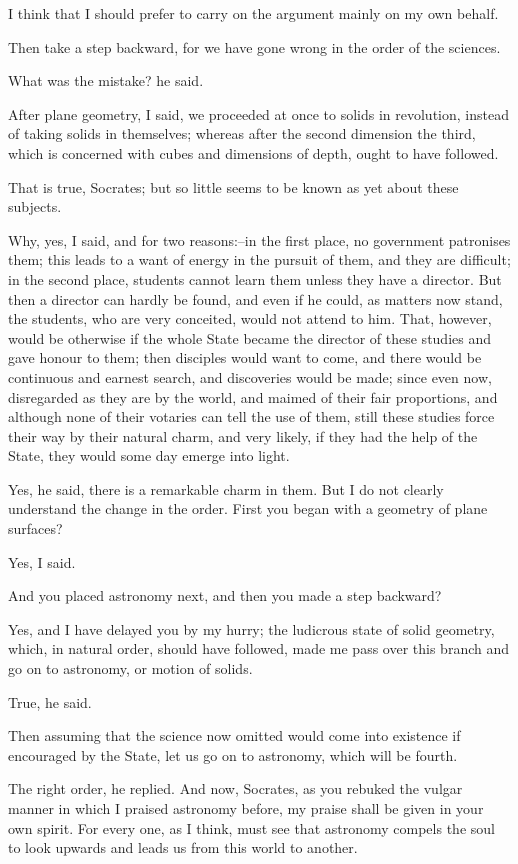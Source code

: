 I think that I should prefer to carry on the argument mainly on my own
behalf.

Then take a step backward, for we have gone wrong in the order of the
sciences.

What was the mistake? he said.

After plane geometry, I said, we proceeded at once to solids in
revolution, instead of taking solids in themselves; whereas after the
second dimension the third, which is concerned with cubes and dimensions
of depth, ought to have followed.

That is true, Socrates; but so little seems to be known as yet about
these subjects.

Why, yes, I said, and for two reasons:--in the first place, no
government patronises them; this leads to a want of energy in the
pursuit of them, and they are difficult; in the second place, students
cannot learn them unless they have a director. But then a director
can hardly be found, and even if he could, as matters now stand,
the students, who are very conceited, would not attend to him. That,
however, would be otherwise if the whole State became the director of
these studies and gave honour to them; then disciples would want to
come, and there would be continuous and earnest search, and discoveries
would be made; since even now, disregarded as they are by the world, and
maimed of their fair proportions, and although none of their votaries
can tell the use of them, still these studies force their way by their
natural charm, and very likely, if they had the help of the State, they
would some day emerge into light.

Yes, he said, there is a remarkable charm in them. But I do not clearly
understand the change in the order. First you began with a geometry of
plane surfaces?

Yes, I said.

And you placed astronomy next, and then you made a step backward?

Yes, and I have delayed you by my hurry; the ludicrous state of solid
geometry, which, in natural order, should have followed, made me pass
over this branch and go on to astronomy, or motion of solids.

True, he said.

Then assuming that the science now omitted would come into existence
if encouraged by the State, let us go on to astronomy, which will be
fourth.

The right order, he replied. And now, Socrates, as you rebuked the
vulgar manner in which I praised astronomy before, my praise shall
be given in your own spirit. For every one, as I think, must see that
astronomy compels the soul to look upwards and leads us from this world
to another.

